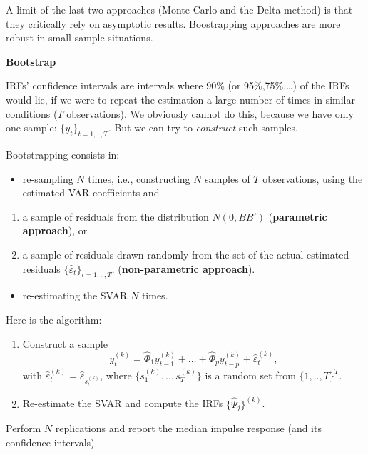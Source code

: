 \documentclass[
  12pt,
]{book}
\providecommand{\tightlist}{%
  \setlength{\itemsep}{0pt}\setlength{\parskip}{0pt}}
\theoremstyle{definition}
\theoremstyle{definition}
\theoremstyle{definition}
\theoremstyle{definition}
\theoremstyle{remark}
\begin{document}
A limit of the last two approaches (Monte Carlo and the Delta method) is that they critically rely on asymptotic results. Boostrapping approaches are more robust in small-sample situations.

\textbf{Bootstrap}

IRFs' confidence intervals are intervals where 90\% (or 95\%,75\%,\ldots) of the IRFs would lie, if we were to repeat the estimation a large number of times in similar conditions (\(T\) observations). We obviously cannot do this, because we have only one sample: \(\{y_t\}_{t=1,..,T}\). But we can try to \emph{construct} such samples.

Bootstrapping consists in:

\begin{itemize}
\tightlist
\item
  re-sampling \(N\) times, i.e., constructing \(N\) samples of \(T\) observations, using the estimated
  VAR coefficients and
\end{itemize}

\begin{enumerate}
\def\labelenumi{\alph{enumi}.}
\tightlist
\item
  a sample of residuals from the distribution \(N(0,BB')\) (\textbf{parametric approach}), or
\item
  a sample of residuals drawn randomly from the set of the actual estimated residuals \(\{\hat\varepsilon_t\}_{t=1,..,T}\). (\textbf{non-parametric approach}).
\end{enumerate}

\begin{itemize}
\tightlist
\item
  re-estimating the SVAR \(N\) times.
\end{itemize}

Here is the algorithm:

\begin{enumerate}
\def\labelenumi{\arabic{enumi}.}
\tightlist
\item
  Construct a sample
  \[
  y_t^{(k)}=\widehat{\Phi}_1 y_{t-1}^{(k)} + \dots + \widehat{\Phi}_p y_{t-p}^{(k)} + \hat\varepsilon_t^{(k)},
  \]
  with \(\hat\varepsilon_{t}^{(k)}=\hat\varepsilon_{s_t^{(k)}}\), where \(\{s_1^{(k)},..,s_T^{(k)}\}\) is a random set from \(\{1,..,T\}^T\).
\item
  Re-estimate the SVAR and compute the IRFs \(\{\widehat{\Psi}_j\}^{(k)}\).
\end{enumerate}

Perform \(N\) replications and report the median impulse response (and its confidence intervals).
\end{document}
